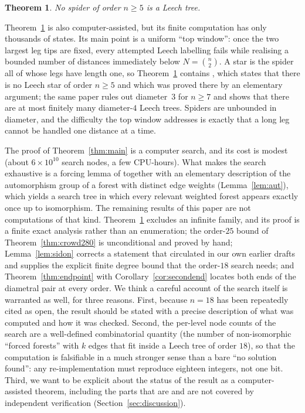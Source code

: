 \documentclass[11pt,a4paper]{article}
\theoremstyle{plain}
\newtheorem{theorem}{Theorem}[section]
\theoremstyle{remark}
\newcommand{\bin}[2]{\binom{#1}{#2}}
\begin{document}
\begin{theorem}\label{thm:spider}
No spider of order $n\ge5$ is a Leech tree.
\end{theorem}

Theorem~\ref{thm:spider} is also computer-assisted, but its finite computation
has only thousands of states.  Its main point is a uniform ``top window'': once
the two largest leg tips are fixed, every attempted Leech labelling fails while
realising a bounded number of distances immediately below $N=\bin n2$.  A star
is the spider all of whose legs have length one, so Theorem~\ref{thm:spider}
contains \cite[Thm.~1.1]{LuoYu2024}, which states that there is no Leech star of
order $n\ge5$ and which was proved there by an elementary argument; the same
paper rules out diameter~$3$ for $n\ge7$ and shows that there are at most
finitely many diameter-$4$ Leech trees.  Spiders are unbounded in diameter, and
the difficulty the top window addresses is exactly that a long leg cannot be
handled one distance at a time.

The proof of Theorem~\ref{thm:main} is a computer search, and its cost is
modest (about $6\times10^{10}$ search nodes, a few CPU-hours).  What makes the
search exhaustive is a forcing lemma of
\cite{SzekelyWangZhang2005,Calhoun2007} together with an elementary description
of the automorphism group of a forest with distinct edge weights
(Lemma~\ref{lem:aut}), which yields a search tree in which every relevant
weighted forest appears exactly once up to isomorphism.  The remaining results
of this paper are not computations of that kind.  Theorem~\ref{thm:spider}
excludes an infinite family, and its proof is a finite exact analysis rather
than an enumeration; the order-$25$ bound of Theorem~\ref{thm:crowd280} is
unconditional and proved by hand; Lemma~\ref{lem:sidon} corrects a statement
that circulated in our own earlier drafts and supplies the explicit finite
degree bound that the order-$18$ search needs; and
Theorem~\ref{thm:endpoint} with Corollary~\ref{cor:secondend} locates both ends
of the diametral pair at every order.  We think a careful account of the search
itself is warranted as well, for three reasons.  First, because $n=18$
has been repeatedly cited as open, the result should be stated with a precise
description of what was computed and how it was checked.  Second, the per-level
node counts of the search are a well-defined combinatorial quantity (the number
of non-isomorphic ``forced forests'' with $k$ edges that fit inside a Leech tree
of order $18$), so that the computation is falsifiable in a much stronger sense
than a bare ``no solution found'': any re-implementation must reproduce eighteen
integers, not one bit.  Third, we want to be explicit about the status of the
result as a computer-assisted theorem, including the parts that are and are not
covered by independent verification (Section~\ref{sec:discussion}).
\end{document}
